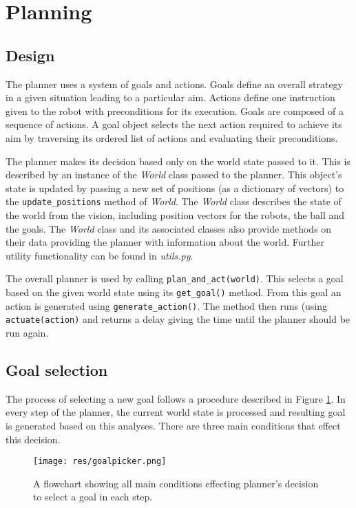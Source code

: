 \section{Planning}

\subsection{Design}

The planner uses a system of goals and actions. Goals define an overall strategy in a given situation leading to a particular aim. Actions define one instruction given to the robot with preconditions for its execution. Goals are composed of a sequence of actions. A goal object selects the next action required to achieve its aim by traversing its ordered list of actions and evaluating their preconditions.

The planner makes its decision based only on the world state passed to it. This is described by an instance of the \emph{World} class passed to the planner. This object's state is updated by passing a new set of positions (as a dictionary of vectors) to the \texttt{update\_positions} method of \emph{World}. The \emph{World} class describes the state of the world from the vision, including position vectors for the robots, the ball and the goals. The \emph{World} class and its associated classes also provide methods on their data providing the planner with information about the world. Further utility functionality can be found in \emph{utils.py}.

The overall planner is used by calling \texttt{plan\_and\_act(world)}. This selects a goal based on the given world state using its \texttt{get\_goal()} method. From this goal an action is generated using \texttt{generate\_action()}. The method then runs (using \texttt{actuate(action)} and returns a delay giving the time until the planner should be run again.


\pagebreak
\subsection{Goal selection}

The process of selecting a new goal follows a procedure described in Figure \ref{fig:goalpicker}. In every step of the planner, the current world state is processed and resulting goal is generated based on this analyses. There are three main conditions that effect this decision.


\begin{figure}[H]
	\begin{center}
    \texttt{[image: res/goalpicker.png]}
    \caption{A flowchart showing all main conditions effecting planner's decision to select a goal in each step.}
    \label{fig:goalpicker}
	\end{center}
\end{figure}

